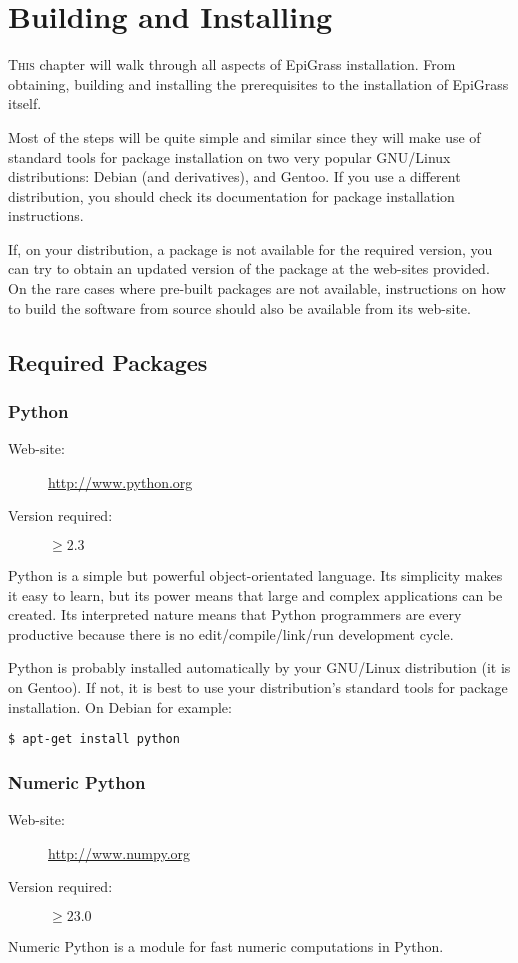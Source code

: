 \chapter{Building and Installing}
\label{install} 
\lettrine{T}{his} chapter will walk through all aspects of EpiGrass installation. From obtaining, building and installing  the prerequisites to the installation of EpiGrass itself.

Most of the steps will be quite simple and similar since they will make use of standard tools for package installation on two very popular GNU/Linux distributions: Debian (and derivatives), and Gentoo. If you use a different distribution, you should check its documentation for package installation instructions.

If, on your distribution, a package is not available for the required version, you can try to obtain an updated version of the package at the web-sites provided. On the rare cases where pre-built packages are not available, instructions on how to build the software from source should also be available from its web-site.
\section{Required Packages}
\subsection{Python}
\begin{description}
\item[Web-site:] \url{http://www.python.org}
\item[Version required:] $\geq2.3$
\end{description}
Python is a simple but powerful object-orientated language. Its simplicity makes it easy to learn, but its power means that large and complex applications can be created. Its interpreted nature means that Python programmers are every productive because there is no edit/compile/link/run development cycle.

Python is probably installed automatically by your GNU/Linux distribution (it is on Gentoo). If not, it is best to use your distribution's standard tools for package installation. On Debian for example:
\begin{lstlisting}[frame=trBL, caption=Installation of Python in a Debian-based Gnu/Linux distribution. ,label=lst:pyinst]
$ apt-get install python
\end{lstlisting}

\subsection{Numeric Python}
\begin{description}
\item[Web-site:] \url{http://www.numpy.org}
\item[Version required:] $\geq23.0$
\end{description}
Numeric Python is a module for fast numeric computations in Python.

